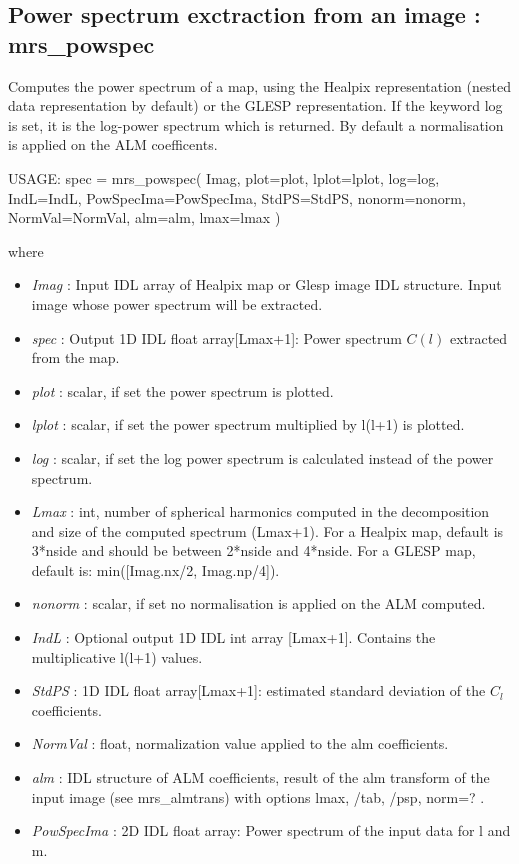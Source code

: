 \subsection{Power spectrum exctraction from an image : mrs\_powspec}
Computes the power spectrum of a map, using the Healpix representation (nested data representation by default) 
or the GLESP representation. If the keyword log is set, it is the log-power spectrum which is returned. 
By default a normalisation is applied on the ALM coefficents.
{\bf
\begin{center}
     USAGE: spec = mrs\_powspec( Imag, plot=plot, lplot=lplot, log=log, IndL=IndL, PowSpecIma=PowSpecIma, StdPS=StdPS, nonorm=nonorm, NormVal=NormVal, alm=alm, lmax=lmax )
\end{center}}
where
\begin{itemize}
\item {\em Imag} : Input IDL array of Healpix map or Glesp image IDL structure. Input image whose power spectrum will be extracted.
\item {\em spec} : Output 1D IDL float array[Lmax+1]: Power spectrum $C(l)$ extracted from the map.
\item {\em plot} : scalar, if set the power spectrum is plotted.
\item {\em lplot} : scalar, if set the power spectrum multiplied by l(l+1) is plotted.
\item {\em log} : scalar, if set the log power spectrum is calculated instead of the power spectrum.
\item {\em Lmax} : int, number of spherical harmonics computed in the decomposition and size of the computed spectrum (Lmax+1). 
For a Healpix map, default is 3*nside and should be between 2*nside and 4*nside. For a GLESP map, default is: min([Imag.nx/2, Imag.np/4]).
\item {\em nonorm} : scalar, if set no normalisation is applied on the ALM computed.
\item {\em IndL} : Optional output 1D IDL int array [Lmax+1]. Contains the multiplicative l(l+1) values.
\item {\em StdPS} : 1D IDL float array[Lmax+1]: estimated standard deviation of the $C_l$ coefficients.
\item {\em NormVal} : float, normalization value applied to the alm coefficients.
\item {\em alm} : IDL structure of ALM coefficients, result of the alm transform of the input image (see mrs\_almtrans) with options lmax, /tab, /psp, norm=? .
\item {\em PowSpecIma} : 2D IDL float array: Power spectrum of the input data for l and m.
\end{itemize}

